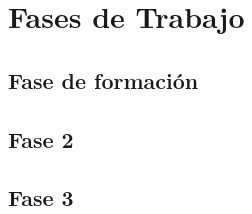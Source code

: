 \chapter{Fases de Trabajo}
\label{sec:fases-trabajo}

\section{Fase de formación}
\label{subsec:formacion}

\section{Fase 2}
\label{subsec:fase2}

\section{Fase 3}
\label{subsec:fase3}
